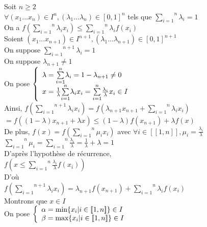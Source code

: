 \begin{prv}

		Soit $n \ge 2$\\
		$\forall (x_1...x_n) \in I^n, (\lambda_1...\lambda_n) \in [0,1]^n$ tels que	$\overset{n}{\underset{i=1}{\sum}} \lambda_i = 1$\\
		On a $f(\overset{n}{\underset{i=1}{\sum}} \lambda_i x_i) \leq \overset{n}{\underset{i=1}{\sum}} \lambda_i f(x_i)$\\

		Soient $(x_1...x_{n+1}) \in I^{n+1}, (\lambda_1...\lambda_{n+1}) \in [0,1]^{n+1}$\\
		On suppose $\overset{n+1}{\underset{i=1}{\sum}} \lambda_i = 1$\\
		On suppose $\lambda_{n+1} \neq 1$\\

		On pose $\left\{\begin{array}{l c r} \lambda = \overset{n}{\underset{i=1}{\sum}} \lambda_i = 1 - \lambda_{n+1} \neq 0 \\ x = \frac{1}{\lambda}\overset{n}{\underset{i=1}{\sum}} \lambda_i x_i = \overset{n}{\underset{i=1}{\sum}} \frac{\lambda_i}{\lambda} x_i \in I \end{array}\right.$\\

		Ainsi, $f(\overset{n+1}{\underset{i=1}{\sum}} \lambda_i x_i) = f(\lambda_{n+1}x_{n+1} + \overset{n}{\underset{i=1}{\sum}} \lambda_i x_i)$\\
				$= f((1 -\lambda)x_{n+1} + \lambda x) \leq (1-\lambda)f(x_{n+1}) + \lambda f(x)$\\

		De plus, $f(x) = f(\overset{n}{\underset{i=1}{\sum}} \mu_i x_i)$ avec $\forall i \in [\![1,n]\!],\mu_i = \frac{\lambda_i}{\lambda}$\\
		$\overset{n}{\underset{i=1}{\sum}} \mu_i = \overset{n}{\underset{i=1}{\sum}} \frac{\lambda_i}{\lambda} = \frac{1}{\lambda} + \lambda = 1$\\

		D’après l’hypothèse de récurrence,\\
		$f(x \leq \overset{n}{\underset{i=1}{\sum}} \frac{\lambda_i}{\lambda} f(x_i))$\\
		D’où\\
		$f(\overset{n+1}{\underset{i=1}{\sum}} \lambda_i x_i) = \lambda_{n+1} f(x_{n+1}) + \overset{n}{\underset{i=1}{\sum}} \lambda_i f(x_i)$\\

		Montrons que $x \in I$\\
		On pose $\left\{\begin{array}{l c r}\alpha = \text{min}\{x_i|i \in [\! [1,n]\!]\} \in I \\ \beta = \text{max}\{x_i|i \in [\! [1,n]\!]\} \in I \end{array}\right.$\\


\end{prv}

